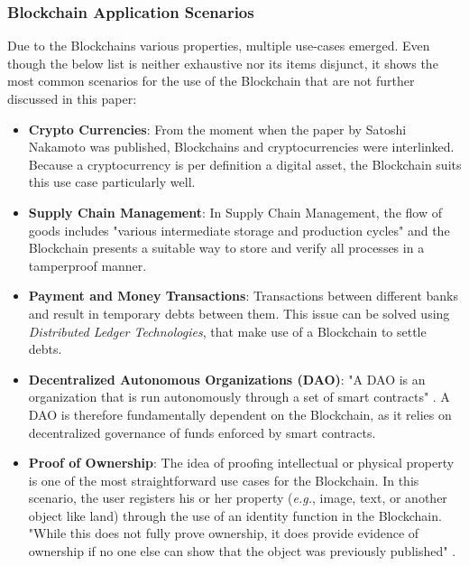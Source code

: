 \subsubsection{Blockchain Application Scenarios}
Due to the Blockchains various properties, multiple use-cases emerged. Even though the below list is neither exhaustive nor its items disjunct, it shows the most common scenarios for the use of the Blockchain \cite{Wust2017} that are not further discussed in this paper:
\begin{itemize}
  \item \textbf{Crypto Currencies}: From the moment when the paper by Satoshi Nakamoto \cite{Nakamoto2009} was published, Blockchains and cryptocurrencies were interlinked. Because a cryptocurrency is per definition a digital asset, the Blockchain suits this use case particularly well.
  \item \textbf{Supply Chain Management}: In Supply Chain Management, the flow of goods includes "various intermediate storage and production cycles" \cite{Wust2017} and the Blockchain presents a suitable way to store and verify all processes in a tamperproof manner.
  \item \textbf{Payment and Money Transactions}: Transactions between different banks and result in temporary debts between them. This issue can be solved using \textit{Distributed Ledger Technologies}, that make use of a Blockchain to settle debts.
  \item \textbf{Decentralized Autonomous Organizations (DAO)}: "A DAO is an organization that is run autonomously through a set of smart contracts" \cite{Wust2017}. A DAO is therefore fundamentally dependent on the Blockchain, as it relies on decentralized governance of funds enforced by smart contracts.
  \item \textbf{Proof of Ownership}: The idea of proofing intellectual or physical property is one of the most straightforward use cases for the Blockchain. In this scenario, the user registers his or her property (\textit{e.g.}, image, text, or another object like land) through the use of an identity function in the Blockchain. "While this does not fully prove ownership, it does provide evidence of ownership if no one else can show that the object was previously published" \cite{Wust2017}.
\end{itemize}

